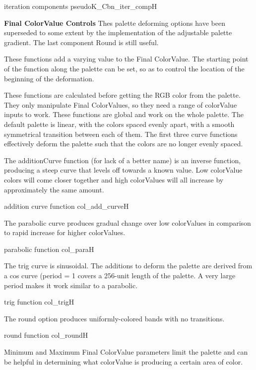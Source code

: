 {iteration components}
{pseudoK_Cbn_iter_comp}{H}

\textbf{Final ColorValue Controls}
Thes palette deforming options have been superseded to some extent by the implementation of the adjustable palette gradient. The last component Round is still useful.

These functions add a varying value to the Final ColorValue. The starting point of the function along the palette can be set, so as to control the location of the beginning of the deformation.

These functions are calculated before getting the RGB color from the palette. They only manipulate Final ColorValues, so they need a range of colorValue inputs to work. These functions are global and work on the whole palette. The default palette is linear, with the colors spaced evenly apart, with a smooth symmetrical transition between each of them. The first three curve functions effectively deform the palette such that the colors are no longer evenly spaced.

The additionCurve function (for lack of a better name) is an inverse function, producing a steep curve that levels off towards a known value. Low colorValue colors will come closer together and high colorValues will all increase by approximately the same amount.

{addition curve function}
{col_add_curve}{H}

The parabolic curve produces gradual change over low colorValues in comparison to rapid increase for higher colorValues.

{parabolic function}
{col_para}{H}

The trig curve is sinusoidal. The additions to deform the palette are derived from a cos curve (period = 1 covers a 256-unit length of the palette. A very large period makes it work similar to a parabolic.

{trig function}
{col_trig}{H}

The round option produces uniformly-colored bands with no transitions.

{round function}
{col_round}{H}

Minimum and Maximum Final ColorValue parameters limit the palette and can be helpful in determining what colorValue is producing a certain area of color.







